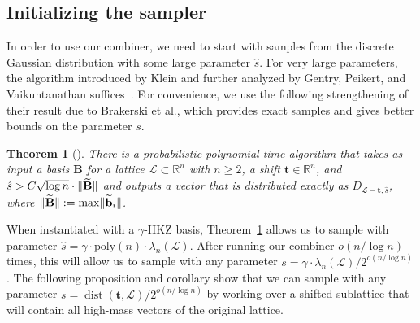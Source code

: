 \documentclass[11pt]{article}
\newtheorem{theorem}{Theorem}[section]
\newcommand{\R}{\ensuremath{\mathbb{R}}}
\renewcommand{\vec}[1]{\ensuremath{\mathbf{#1}}}
\newcommand{\basis}{\ensuremath{\mathbf{B}}}
\newcommand{\poly}{\mathrm{poly}}
\newcommand{\lat}{\mathcal{L}}
\newcommand{\gs}[1]{\ensuremath{\widetilde{#1}}}
\DeclareMathOperator{\dist}{dist}
\DeclarePairedDelimiter\length{\lVert}{\rVert}
\begin{document}
\subsection{Initializing the sampler}

In order to use our combiner, we need to start with samples from the discrete Gaussian distribution with some large parameter $\hat{s}$.  For very large parameters, the algorithm introduced by Klein and further analyzed by Gentry, Peikert, and Vaikuntanathan suffices~\cite{Klein00, GPV08}. 
For convenience, we use the following strengthening of their result due to Brakerski et al., which provides exact samples and gives better bounds on the parameter $s$.
\begin{theorem}[{\cite[Lemma 2.3]{BLPRS13}}]
\label{thm:GPV}
There is a probabilistic polynomial-time algorithm that takes as input a basis $\basis $ for a lattice $\lat \subset \R^n$ with $n \geq 2$, a shift $\vec{t} \in \R^n$, and $\hat{s} > C\sqrt{ \log n} \cdot \length{\gs{\basis}}$ and outputs a vector that is distributed exactly as $D_{\lat - \vec{t}, \hat{s}}$, where $\length{\gs{\basis}} := \max \length{\gs{\vec{b}}_i}$.
\end{theorem}

When instantiated with a $\gamma$-HKZ basis, Theorem~\ref{thm:GPV} allows us to sample with parameter $\hat{s} = \gamma \cdot \poly(n) \cdot \lambda_n(\lat)$. After running our combiner $o(n/\log n)$ times, this will allow us to sample with any parameter $s = \gamma \cdot  \lambda_n(\lat)/2^{o(n/\log n)}$. The following proposition and corollary show that we can sample with any parameter $s = \dist(\vec{t}, \lat)/2^{o(n/\log n)}$ by working over a shifted sublattice that will contain all high-mass vectors of the original lattice.
 
\end{document}
